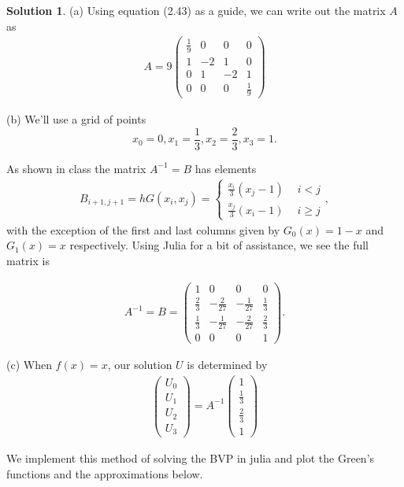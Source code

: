 \documentclass[12pt]{article}
\theoremstyle{definition}
\newtheorem{sol}{Solution}
\theoremstyle{remark}
\begin{document}
\begin{sol}
    (a) Using equation (2.43) as a guide, we can write out the matrix $A$ as 
\begin{align*}
A = 9
\begin{pmatrix}
    \frac{1}{9} & 0 & 0 & 0 \\
1 & -2 & 1 & 0\\
0 & 1 & -2 & 1\\
0 & 0 & 0 & \frac{1}{9}
\end{pmatrix}
\end{align*}

(b)  We'll use a grid of points
\begin{equation*}
x_{0} = 0, x_{1} = \frac{1}{3}, x_{2} = \frac{2}{3}, x_{3} = 1.
\end{equation*}

As shown in class the matrix $A^{-1} = B$ has elements
\begin{align*}
    B_{i+1,j+1} = h G(x_{i}, x_{j}) 
    = \begin{cases}
        \frac{x_{i}}{3} (x_{j}-1) \ \quad i < j \\
        \frac{x_{j}}{3} (x_{i}-1) \ \quad i \geq j 
    \end{cases},
\end{align*}
with the exception of the first and last columns given by $G_{0}(x) = 1 - x$ and $G_{1}(x) = x$ respectively.
Using Julia for a bit of assistance, we see the full matrix is 

\begin{align*}
A^{-1} = B = 
\begin{pmatrix}
   1 & 0 & 0 & 0\\
   \frac{2}{3} & -\frac{2}{27}& -\frac{1}{27}&  \frac{1}{3}\\
   \frac{1}{3} & -\frac{1}{27} & -\frac{2}{27} & \frac{2}{3}\\
   0 & 0 & 0 & 1
\end{pmatrix}.
\end{align*}

(c) When $f(x) = x$, our solution $U$ is determined by
\begin{align*}
\begin{pmatrix}
    U_{0}\\
    U_{1}\\
    U_{2}\\
    U_{3}
\end{pmatrix} = A^{-1} 
\begin{pmatrix}
    1\\
    \frac{1}{3}\\
    \frac{2}{3}\\
    1
\end{pmatrix} 
\end{align*}

We implement this method of solving the BVP in julia and plot the Green's functions and the approximations below.


\end{sol}
\end{document}
